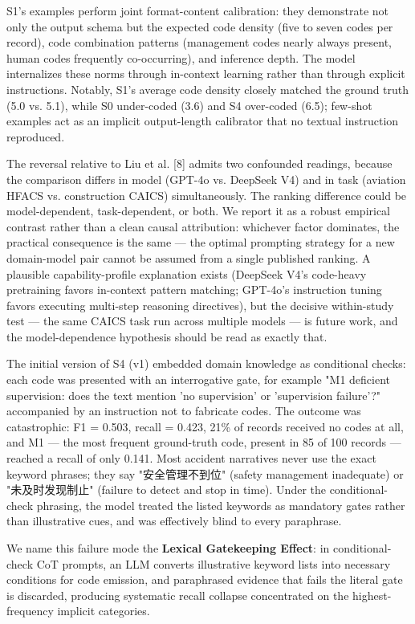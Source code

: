 \documentclass[11pt]{article}
\begin{document}
S1's examples perform joint format-content calibration: they demonstrate not only the output schema but the expected code density (five to seven codes per record), code combination patterns (management codes nearly always present, human codes frequently co-occurring), and inference depth. The model internalizes these norms through in-context learning rather than through explicit instructions. Notably, S1's average code density closely matched the ground truth (5.0 vs. 5.1), while S0 under-coded (3.6) and S4 over-coded (6.5); few-shot examples act as an implicit output-length calibrator that no textual instruction reproduced.

The reversal relative to Liu et al. [8] admits two confounded readings, because the comparison differs in model (GPT-4o vs. DeepSeek V4) and in task (aviation HFACS vs. construction CAICS) simultaneously. The ranking difference could be model-dependent, task-dependent, or both. We report it as a robust empirical contrast rather than a clean causal attribution: whichever factor dominates, the practical consequence is the same --- the optimal prompting strategy for a new domain-model pair cannot be assumed from a single published ranking. A plausible capability-profile explanation exists (DeepSeek V4's code-heavy pretraining favors in-context pattern matching; GPT-4o's instruction tuning favors executing multi-step reasoning directives), but the decisive within-study test --- the same CAICS task run across multiple models --- is future work, and the model-dependence hypothesis should be read as exactly that.

The initial version of S4 (v1) embedded domain knowledge as conditional checks: each code was presented with an interrogative gate, for example "M1 deficient supervision: does the text mention 'no supervision' or 'supervision failure'?" accompanied by an instruction not to fabricate codes. The outcome was catastrophic: F1 = 0.503, recall = 0.423, 21\% of records received no codes at all, and M1 --- the most frequent ground-truth code, present in 85 of 100 records --- reached a recall of only 0.141. Most accident narratives never use the exact keyword phrases; they say "{\cjkfont 安全管理不到位}" (safety management inadequate) or "{\cjkfont 未及时发现制止}" (failure to detect and stop in time). Under the conditional-check phrasing, the model treated the listed keywords as mandatory gates rather than illustrative cues, and was effectively blind to every paraphrase.

We name this failure mode the \textbf{Lexical Gatekeeping Effect}: in conditional-check CoT prompts, an LLM converts illustrative keyword lists into necessary conditions for code emission, and paraphrased evidence that fails the literal gate is discarded, producing systematic recall collapse concentrated on the highest-frequency implicit categories.
\end{document}
